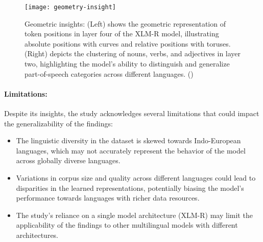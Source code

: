 \begin{figure}[tbh]
	\centering
	\texttt{[image: geometry-insight]}
	\caption[Geometric insights of tokens]{Geometric insights: (Left) shows the geometric representation of token positions in layer four of the XLM-R model, illustrating absolute positions with curves and relative positions with toruses. (Right) depicts the clustering of nouns, verbs, and adjectives in layer two, highlighting the model's ability to distinguish and generalize part-of-speech categories across different languages. (\citet{chang2022geometry})}
	\label{fig: geometry-insight}
\end{figure}

\paragraph{Limitations:} Despite its insights, the study acknowledges several limitations that could impact the generalizability of the findings:
\begin{itemize}
	\item The linguistic diversity in the dataset is skewed towards Indo-European languages, which may not accurately represent the behavior of the model across globally diverse languages.
	\item Variations in corpus size and quality across different languages could lead to disparities in the learned representations, potentially biasing the model's performance towards languages with richer data resources.
	\item The study's reliance on a single model architecture (XLM-R) may limit the applicability of the findings to other multilingual models with different architectures.
\end{itemize}
